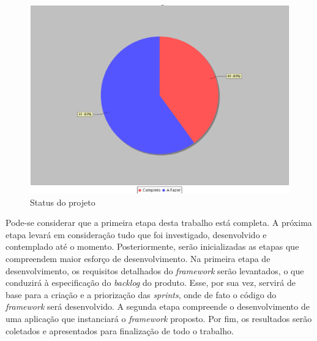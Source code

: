 \begin{figure}[!h]
	\centering
	\includegraphics[scale=0.5]{figuras/capitulo6/status_projeto.eps}
	\caption{Status do projeto}
	\label{status projeto}
\end{figure}

Pode-se considerar que a primeira etapa desta trabalho está completa. A próxima etapa levará em consideração tudo que foi investigado, desenvolvido e contemplado até o momento. Posteriormente, serão inicializadas as etapas que compreendem maior esforço de desenvolvimento. Na primeira etapa de desenvolvimento, os requisitos detalhados do \textit{framework} serão levantados, o que conduzirá à especificação do \textit{backlog} do produto. Esse, por sua vez, servirá de base para a criação e a priorização das \textit{sprints}, onde de fato o código do \textit{framework} será desenvolvido. A segunda etapa compreende o desenvolvimento de uma aplicação que instanciará o \textit{framework} proposto. Por fim, os resultados serão coletados e apresentados para finalização de todo o trabalho.
